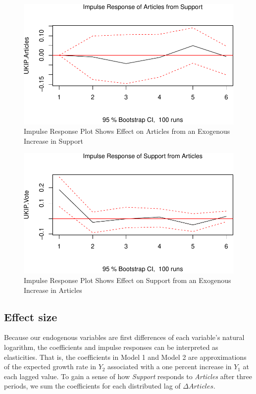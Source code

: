 \documentclass[12pt,article]{article}
\begin{document}
\begin{figure}[htbp]
\centering
\includegraphics{ukip_media_files/figure-latex/unnamed-chunk-7-1.pdf}
\caption{Impulse Response Plot Shows Effect on Articles from an
Exogenous Increase in Support}
\end{figure}

\begin{figure}[htbp]
\centering
\includegraphics{ukip_media_files/figure-latex/unnamed-chunk-8-1.pdf}
\caption{Impulse Response Plot Shows Effect on Support from an Exogenous
Increase in Articles}
\end{figure}

\subsection{Effect size}\label{effect-size}

Because our endogenous variables are first differences of each
variable's natural logarithm, the coefficients and impulse responses can
be interpreted as elasticities. That is, the coefficients in Model 1 and
Model 2 are approximations of the expected growth rate in \(Y_2\)
associated with a one percent increase in \(Y_1\) at each lagged value.
To gain a sense of how \emph{Support} responds to \emph{Articles} after
three periods, we sum the coefficients for each distributed lag of
\(\Delta Articles\).
\end{document}

